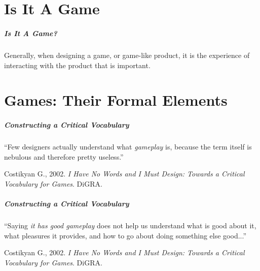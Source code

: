 \part{Is It A Game}
\frame{\partpage}





\begin{frame}
	\frametitle{Is It A Game?}
	
	Generally, when designing a game, or game-like product, it is the experience of interacting with the product that is important.

\end{frame}

\part{Games: Their Formal Elements}
\frame{\partpage}

\begin{frame}
	\frametitle{Constructing a Critical Vocabulary}
	
	``Few designers actually understand what \textit{gameplay} is, because the term itself is nebulous and therefore pretty useless.''
	
	\vspace{3em}
	
	Costikyan G., 2002. \textit{I Have No Words and I Must Design: Towards a Critical Vocabulary for Games}. DiGRA.

\end{frame}

\begin{frame}
	\frametitle{Constructing a Critical Vocabulary}
	
	``Saying \textit{it has good gameplay} does not help us understand what is good about it, what pleasures it provides, and how to go about doing something else good...''
	
	\vspace{3em}
	
	Costikyan G., 2002. \textit{I Have No Words and I Must Design: Towards a Critical Vocabulary for Games}. DiGRA.

\end{frame}

